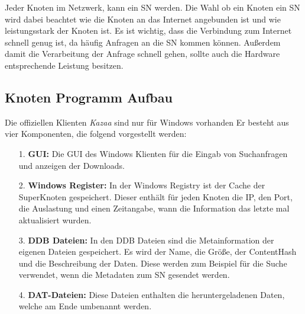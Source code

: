 Jeder Knoten im Netzwerk, kann ein SN werden.
Die Wahl ob ein Knoten ein SN wird dabei beachtet wie die Knoten an  das Internet angebunden ist und wie leistungsstark der Knoten ist.
Es ist wichtig, dass die Verbindung zum Internet schnell genug ist, da häufig Anfragen an die SN kommen können.
Außerdem damit die Verarbeitung der Anfrage schnell gehen, sollte auch die Hardware  entsprechende Leistung besitzen.

\subsection{Knoten Programm Aufbau}
\label{subsec:proAuf}

Die offiziellen Klienten \textit{Kazaa}\cite{kazaa} sind nur für Windows vorhanden
Er besteht aus vier Komponenten, die folgend vorgestellt werden:

\begin{itemize}
\item[1.] \textbf{GUI:} Die GUI des Windows Klienten für die Eingab von Suchanfragen und anzeigen der Downloads.
\item[2.] \textbf{Windows Register:} In der Windows Registry ist der Cache der SuperKnoten gespeichert.
Dieser enthält für jeden Knoten die IP, den Port, die Auslastung und einen Zeitangabe, wann die Information das letzte mal aktualisiert wurden.
\item[3.] \textbf{DDB Dateien:} In den DDB Dateien sind die Metainformation der eigenen Dateien gespeichert. Es wird der Name, die Größe, der ContentHash und die Beschreibung der Daten. Diese werden zum Beispiel für die Suche verwendet, wenn die Metadaten zum SN gesendet werden.
\item[4.] \textbf{DAT-Dateien:} Diese Dateien enthalten die heruntergeladenen Daten, welche am Ende umbenannt werden.
\end{itemize}

